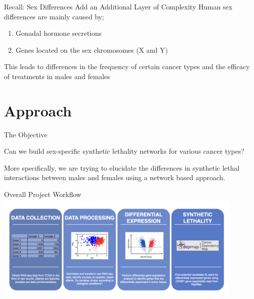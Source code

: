 \documentclass{beamer}
\begin{document}
	\begin{frame}{Recall: Sex Differences Add an Additional Layer of Complexity}
		Human sex differences are mainly caused by;
		\begin{enumerate}
			\item Gonadal hormone secretions
			\item Genes located on the sex chromosomes (X and Y) \newline
		\end{enumerate}
		This leads to differences in the frequency of certain cancer types and the efficacy of treatments in males and females
	\end{frame}

	\section{Approach}
	\begin{frame}{The Objective}
		\begin{center}
			Can we build sex-specific synthetic lethality networks for various cancer types? \newline
			
			More specifically, we are trying to elucidate the differences in synthetic lethal interactions between males and females using a network based approach.
		\end{center}
	\end{frame}

	
	\begin{frame}{Overall Project Workflow}
		\includegraphics[width=12cm, height=5.2cm]{img2.png}
	\end{frame}
\end{document}
